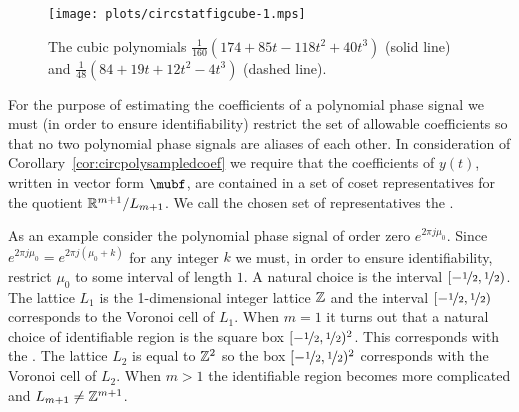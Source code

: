 \documentclass[journal]{IEEEtran}
\begin{document}

\begin{figure}[t]
	\centering
		\texttt{[image: plots/circstatfigcube-1.mps]}
		\caption{The cubic polynomials $\tfrac{1}{160} (174 + 85 t - 118 t^2 + 40 t^3)$ (solid line) and $\tfrac{1}{48} (84 + 19 t + 12 t^2 - 4 t^3)$  (dashed line).}
		\label{fig:circstatplot_cube}
\end{figure}

For the purpose of estimating the coefficients of a polynomial phase signal we must (in order to ensure identifiability) restrict the set of allowable coefficients so that no two polynomial phase signals are aliases of each other. In consideration of Corollary~\ref{cor:circpolysampledcoef} we require that the coefficients of $y(t)$, written in vector form $\mubf$, are contained in a set of coset representatives for the quotient ${\mathbb R}^{m+1}/L_{m+1}$.  We call the chosen set of representatives the .

As an example consider the polynomial phase signal of order zero $e^{2\pi j \mu_0}$.  Since $e^{2\pi j \mu_0} = e^{2\pi j(\mu_0 + k)}$ for any integer $k$ we must, in order to ensure identifiability, restrict $\mu_0$ to some interval of length $1$.  A natural choice is the interval $[-\nicefrac{1}{2}, \nicefrac{1}{2})$. The lattice $L_1$ is the 1-dimensional integer lattice ${\mathbb Z}$ and the interval $[-\nicefrac{1}{2}, \nicefrac{1}{2})$ corresponds to the Voronoi cell of $L_1$. 
When $m=1$ it turns out that a natural choice of identifiable region is the square box $[-\nicefrac{1}{2}, \nicefrac{1}{2})^2$. This corresponds with the .  The lattice $L_2$ is equal to ${\mathbb Z}^2$ so the box $[-\nicefrac{1}{2}, \nicefrac{1}{2})^2$ corresponds with the Voronoi cell of $L_2$.  
When $m > 1$ the identifiable region becomes more complicated and $L_{m+1} \neq {\mathbb Z}^{m+1}$. %
\end{document}
